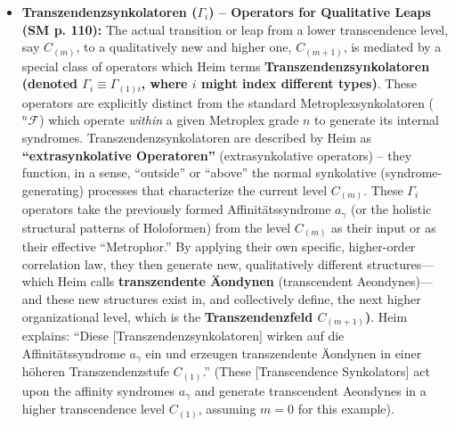 \documentclass[12pt]{article}
\newcommand{\q}[1]{\enquote{#1}}
\newcommand{\metroplexsynkolator}[1]{{}^{#1}\mathcal{F}}
\begin{document}
\begin{itemize}
    \item \textbf{Transzendenzsynkolatoren (\( \Gamma_i \)) – Operators for Qualitative Leaps (SM p. 110):}
    The actual transition or leap from a lower transcendence level, say \( C_{(m)} \), to a qualitatively new and higher one, \( C_{(m+1)} \), is mediated by a special class of operators which Heim terms \textbf{Transzendenzsynkolatoren (denoted \( \Gamma_i \equiv \Gamma_{(1)i} \), where \(i\) might index different types)}. These operators are explicitly distinct from the standard Metroplexsynkolatoren (\( \metroplexsynkolator{n} \)) which operate \textit{within} a given Metroplex grade \(n\) to generate its internal syndromes. Transzendenzsynkolatoren are described by Heim as \textbf{\q{extrasynkolative Operatoren}} (extrasynkolative operators) – they function, in a sense, \q{outside} or \q{above} the normal synkolative (syndrome-generating) processes that characterize the current level \( C_{(m)} \).
    These \( \Gamma_i \) operators take the previously formed Affinitätssyndrome \( a_\gamma \) (or the holistic structural patterns of Holoformen) from the level \( C_{(m)} \) as their input or as their effective \q{Metrophor.} By applying their own specific, higher-order correlation law, they then generate new, qualitatively different structures—which Heim calls \textbf{transzendente Äondynen} (transcendent Aeondynes)—and these new structures exist in, and collectively define, the next higher organizational level, which is the \textbf{Transzendenzfeld \( C_{(m+1)} \))}. Heim explains: \q{Diese [Transzendenzsynkolatoren] wirken auf die Affinitätssyndrome \( a_\gamma \) ein und erzeugen transzendente Äondynen in einer höheren Transzendenzstufe \( C_{(1)} \).} (These [Transcendence Synkolators] act upon the affinity syndromes \( a_\gamma \) and generate transcendent Aeondynes in a higher transcendence level \( C_{(1)} \), assuming \(m=0\) for this example).


\end{itemize}
\end{document}
